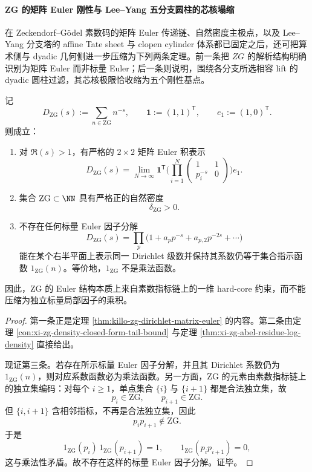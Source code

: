 \paragraph{ZG 的矩阵 Euler 刚性与 Lee--Yang 五分支圆柱的芯核塌缩}
在 Zeckendorf--Gödel 素数码的矩阵 Euler 传递链、自然密度主极点，以及 Lee--Yang 分支塔的 affine Tate sheet 与 clopen cylinder 体系都已固定之后，还可把算术侧与 dyadic 几何侧进一步压缩为下列两条定理。前一条把 \(ZG\) 的解析结构明确识别为矩阵 Euler 而非标量 Euler；后一条则说明，围绕各分支所选相容 lift 的 dyadic 圆柱过滤，其芯核极限恰收缩为五个刚性基点。

\begin{theorem}\label{thm:xi-time-part62dgc-zg-matrix-euler-no-scalar-product}
记
\[
D_{\mathrm{ZG}}(s):=\sum_{n\in \mathrm{ZG}}n^{-s},
\qquad
\mathbf 1:=(1,1)^{\mathsf T},
\qquad
e_1:=(1,0)^{\mathsf T}.
\]
则成立：
\begin{enumerate}
  \item 对 \(\Re(s)>1\)，有严格的 \(2\times 2\) 矩阵 Euler 积表示
  \[
  D_{\mathrm{ZG}}(s)
  =
  \lim_{N\to\infty}
  \mathbf 1^{\mathsf T}
  \Biggl(
  \prod_{i=1}^{N}
  \begin{pmatrix}
  1&1\\[2pt]
  p_i^{-s}&0
  \end{pmatrix}
  \Biggr)e_1.
  \]
  \item 集合 \(\mathrm{ZG}\subset\NN\) 具有严格正的自然密度
  \[
  \delta_{\mathrm{ZG}}>0.
  \]
  \item 不存在任何标量 Euler 因子分解
  \[
  D_{\mathrm{ZG}}(s)
  =
  \prod_{p}
  \bigl(1+a_p p^{-s}+a_{p,2}p^{-2s}+\cdots\bigr)
  \]
  能在某个右半平面上表示同一 Dirichlet 级数并保持其系数仍等于集合指示函数 \(1_{\mathrm{ZG}}(n)\)。等价地，\(1_{\mathrm{ZG}}\) 不是乘法函数。
\end{enumerate}
因此，\(\mathrm{ZG}\) 的 Euler 结构本质上来自素数指标链上的一维 hard-core 约束，而不能压缩为独立标量局部因子的乘积。
\end{theorem}
\begin{proof}
第一条正是定理 \ref{thm:killo-zg-dirichlet-matrix-euler} 的内容。第二条由定理 \ref{con:xi-zg-density-closed-form-tail-bound} 与定理 \ref{thm:xi-zg-abel-residue-log-density} 直接给出。

现证第三条。若存在所示标量 Euler 因子分解，并且其 Dirichlet 系数仍为 \(1_{\mathrm{ZG}}(n)\)，则对应系数函数必为乘法函数。另一方面，\(\mathrm{ZG}\) 的元素由素数指标链上的独立集编码：对每个 \(i\ge 1\)，单点集合 \(\{i\}\) 与 \(\{i+1\}\) 都是合法独立集，故
\[
p_i\in \mathrm{ZG},
\qquad
p_{i+1}\in \mathrm{ZG}.
\]
但 \(\{i,i+1\}\) 含相邻指标，不再是合法独立集，因此
\[
p_ip_{i+1}\notin \mathrm{ZG}.
\]
于是
\[
1_{\mathrm{ZG}}(p_i)\,1_{\mathrm{ZG}}(p_{i+1})=1,
\qquad
1_{\mathrm{ZG}}(p_ip_{i+1})=0,
\]
这与乘法性矛盾。故不存在这样的标量 Euler 因子分解。证毕。
\end{proof}

